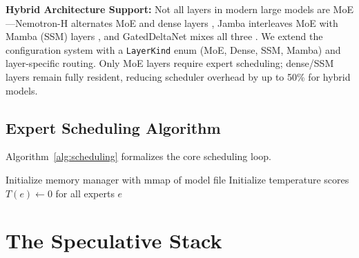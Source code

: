 \documentclass[11pt]{article}
\begin{document}
\textbf{Hybrid Architecture Support:} Not all layers in modern large models are MoE—Nemotron-H alternates MoE and dense layers \cite{nemotron2026}, Jamba interleaves MoE with Mamba (SSM) layers \cite{jamba2024}, and GatedDeltaNet mixes all three \cite{deltanet2025}. We extend the configuration system with a \texttt{LayerKind} enum (MoE, Dense, SSM, Mamba) and layer-specific routing. Only MoE layers require expert scheduling; dense/SSM layers remain fully resident, reducing scheduler overhead by up to 50\% for hybrid models.

\subsection{Expert Scheduling Algorithm}

Algorithm~\ref{alg:scheduling} formalizes the core scheduling loop.

\begin{algorithm}[t]
\caption{ExpertFlow Scheduling Algorithm}
\label{alg:scheduling}
\SetAlgoLined
{}

\BlankLine
Initialize memory manager with mmap of model file\;
Initialize temperature scores $T(e) \gets 0$ for all experts $e$\;
\end{algorithm}

\section{The Speculative Stack}
\label{sec:speculative}
\end{document}
